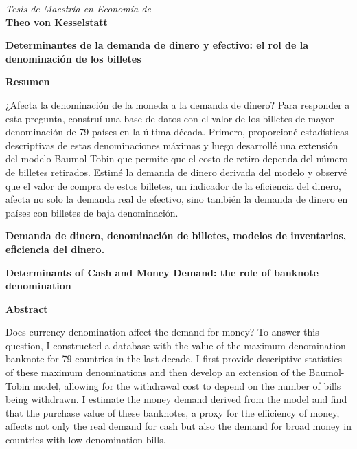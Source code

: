 \documentclass[12pt]{article}
\begin{document}
\newpage

\begin{center}
    \textit{Tesis de Maestría en Economía de} \\[0.2cm]
    \textbf{\LARGE Theo von Kesselstatt}
\end{center}

\vspace{0.8cm}

\noindent
\textbf{Determinantes de la demanda de dinero y efectivo: el rol de la denominación de los billetes}

\vspace{0.3cm}
\noindent
\textbf{Resumen}

\noindent
¿Afecta la denominación de la moneda a la demanda de dinero? Para responder a esta pregunta, construí una base de datos con el valor de los billetes de mayor denominación de 79 países en la última década. Primero, proporcioné estadísticas descriptivas de estas denominaciones máximas y luego desarrollé una extensión del modelo Baumol-Tobin que permite que el costo de retiro dependa del número de billetes retirados. Estimé la demanda de dinero derivada del modelo y observé que el valor de compra de estos billetes, un indicador de la eficiencia del dinero, afecta no solo la demanda real de efectivo, sino también la demanda de dinero en países con billetes de baja denominación.

\vspace{0.5cm}
\noindent
\textbf{Demanda de dinero, denominación de billetes, modelos de inventarios, eficiencia del dinero.}

\vspace{1cm}

\noindent
\textbf{Determinants of Cash and Money Demand: the role of banknote denomination}

\vspace{0.3cm}
\noindent
\textbf{Abstract}

\noindent
Does currency denomination affect the demand for money? To answer this question, I constructed a database with the value of the maximum denomination banknote for 79 countries in the last decade. I first provide descriptive statistics of these maximum denominations and then develop an extension of the Baumol-Tobin model, allowing for the withdrawal cost to depend on the number of bills being withdrawn. I estimate the money demand derived from the model and find that the purchase value of these banknotes, a proxy for the efficiency of money, affects not only the real demand for cash but also the demand for broad money in countries with low-denomination bills.
\end{document}
